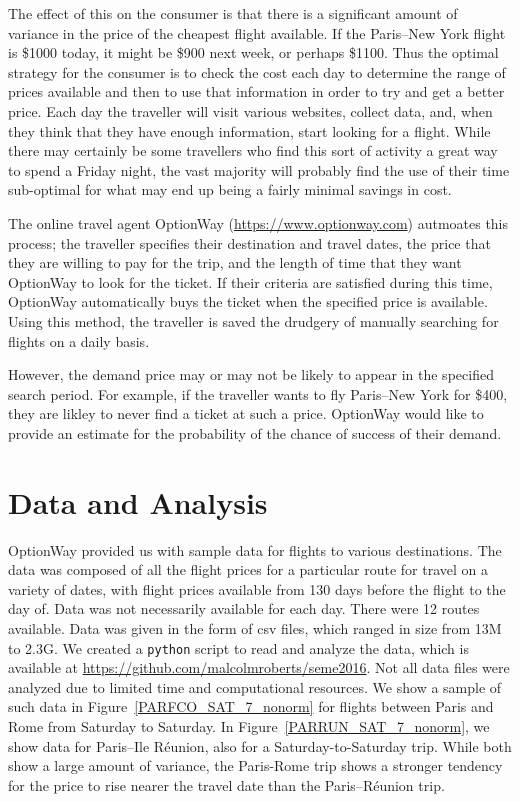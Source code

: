 \documentclass{article}
\begin{document}
The effect of this on the consumer is that there is a significant
amount of variance in the price of the cheapest flight available.  If
the Paris--New York flight is \$1000 today, it might be \$900 next
week, or perhaps \$1100.  Thus the optimal strategy for the consumer
is to check the cost each day to determine the range of prices
available and then to use that information in order to try and get a
better price.  Each day the traveller will visit various websites,
collect data, and, when they think that they have enough information,
start looking for a flight.  While there may certainly be some
travellers who find this sort of activity a great way to spend a
Friday night, the vast majority will probably find the use of their
time sub-optimal for what may end up being a fairly minimal savings in
cost.

The online travel agent OptionWay (\url{https://www.optionway.com})
autmoates this process; the traveller specifies their destination and
travel dates, the price that they are willing to pay for the trip, and
the length of time that they want OptionWay to look for the ticket.
If their criteria are satisfied during this time, OptionWay
automatically buys the ticket when the specified price is available.
Using this method, the traveller is saved the drudgery of manually
searching for flights on a daily basis.

However, the demand price may or may not be likely to appear in the
specified search period.  For example, if the traveller wants to fly
Paris--New York for \$400, they are likley to never find a ticket at
such a price.  OptionWay would like to provide an estimate for the
probability of the chance of success of their demand.

\section{Data and Analysis}

OptionWay provided us with sample data for flights to various
destinations.  The data was composed of all the flight prices for a
particular route for travel on a variety of dates, with flight prices
available from 130 days before the flight to the day of.  Data was not
necessarily available for each day.  There were 12 routes available.
Data was given in the form of csv files, which ranged in size from 13M
to 2.3G.  We created a \texttt{python} script to read and analyze the
data, which is available at
\url{https://github.com/malcolmroberts/seme2016}.  Not all data files
were analyzed due to limited time and computational resources.  We
show a sample of such data in Figure~\ref{PARFCO_SAT_7_nonorm} for
flights between Paris and Rome from Saturday to Saturday.  In
Figure~\ref{PARRUN_SAT_7_nonorm}, we show data for Paris--Ile Réunion,
also for a Saturday-to-Saturday trip.  While both show a large amount
of variance, the Paris-Rome trip shows a stronger tendency for the
price to rise nearer the travel date than the Paris--Réunion trip.
\end{document}
